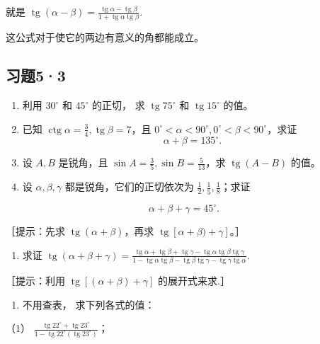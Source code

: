 就是
\(\operatorname{tg}(\alpha - \beta) = \frac{\operatorname{tg}\alpha - \operatorname{tg}\beta}{1 + \operatorname{tg}\alpha\operatorname{tg}\beta}\).

这公式对于使它的两边有意义的角都能成立。

\subsection{习题5·3}

\begin{enumerate}
\item
  利用 \(30^{\circ}\) 和 \(45^{\circ}\) 的正切， 求
  \(\operatorname{tg} 75^{\circ}\) 和 \(\operatorname{tg} 15^{\circ}\)
  的值。
\item
  已知
  \(\operatorname{ctg} \alpha = \frac{3}{4}, \operatorname{tg} \beta = 7\)，且
  \(0^{\circ} < \alpha < 90^{\circ}, 0^{\circ} < \beta < 90^{\circ}\)，求证
\[
\alpha + \beta = 135 ^{\circ}.
\]
\item
  设 \(A, B\) 是锐角，且
  \(\sin A = \frac{3}{5}, \sin B = \frac{5}{13}\)，求
  \(\operatorname{tg}(A - B)\) 的值。
\item
  设 \(\alpha, \beta, \gamma\) 都是锐角，它们的正切依次为
  \(\frac{1}{2}, \frac{1}{5}, \frac{1}{8}\)；求证
\end{enumerate}

\[
\alpha + \beta + \gamma = 45 ^{\circ}.
\]

［提示：先求 \(\operatorname{tg}(\alpha + \beta)\)，再求
\(\operatorname{tg}[\alpha + \beta) + \gamma]\)。］

\begin{enumerate}[start=5]
\item
  求证
  \(\operatorname{tg}(\alpha + \beta + \gamma) = \frac{\operatorname{tg} \alpha + \operatorname{tg} \beta + \operatorname{tg} \gamma - \operatorname{tg} \alpha \operatorname{tg} \beta \operatorname{tg} \gamma}{1 - \operatorname{tg} \alpha \operatorname{tg} \beta - \operatorname{tg} \beta \operatorname{tg} \gamma - \operatorname{tg} \gamma \operatorname{tg} \alpha}\).
\end{enumerate}

［提示：利用 \(\operatorname{tg}[(\alpha + \beta) + \gamma]\)
的展开式来求.］

\begin{enumerate}[start=6]
\item
  不用查表， 求下列各式的值：
\end{enumerate}

（1）
\(\frac{\operatorname{tg} 22^{\circ} + \operatorname{tg} 23^{\circ}}{1 - \operatorname{tg} 22^{\circ} (\operatorname{tg} 23^{\circ})}\)；

